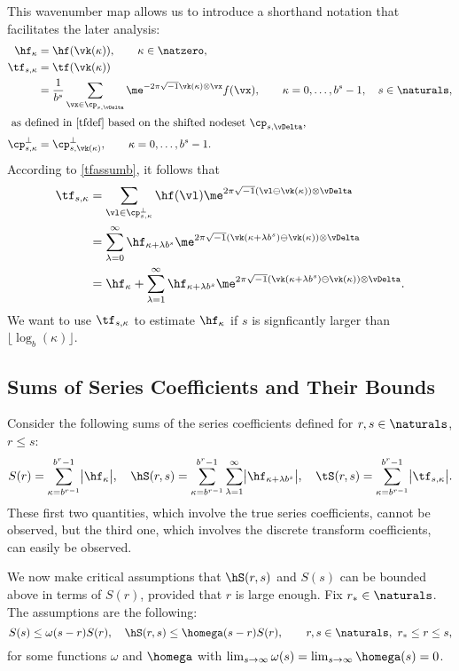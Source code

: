 \documentclass[]{elsarticle}
\begin{document}
This wavenumber map allows us to introduce a shorthand notation that facilitates the later analysis:
\begin{align*}
\hf_{\kappa} & =\hf(\vk(\kappa)), \qquad \kappa \in \natzero,\\
\tf_{s,\kappa}& = \tf(\vk(\kappa)) \\
& = \frac{1}{b^s} \sum_{\vx \in \cp_{s,\vDelta}} \me^{-2 \pi \sqrt{-1} \vk(\kappa) \otimes \vx} f(\vx), \qquad \kappa=0, \ldots, b^s-1, \quad s \in \naturals,\\
\intertext{ as defined in \eqref{tfdef} based on the shifted nodeset $\cp_{s,\vDelta}$,}
\cp^{\perp}_{s,\kappa}&=\cp^{\perp}_{s,\vk(\kappa)}, \qquad \kappa=0, \ldots, b^s-1.
\end{align*}
According to \eqref{tfassumb}, it follows that 
\begin{align}
\nonumber
\tf_{s,\kappa} &= \sum_{\vl \in \cp^{\perp}_{s,\kappa}} \hf(\vl) \me^{2 \pi \sqrt{-1} (\vl \ominus \vk(\kappa)) \otimes \vDelta} \\
\nonumber
&= \sum_{\lambda=0}^{\infty} \hf_{\kappa+\lambda b^{s}} \me^{2 \pi \sqrt{-1} (\vk(\kappa+\lambda b^{s}) \ominus \vk(\kappa)) \otimes \vDelta} \\
& = \hf_{\kappa} + \sum_{\lambda=1}^{\infty} \hf_{\kappa+\lambda b^{s}} \me^{2 \pi \sqrt{-1} (\vk(\kappa+\lambda b^{s}) \ominus \vk(\kappa)) \otimes \vDelta}.
\label{tfassumc}
\end{align}
We want to use $\tf_{s,\kappa}$ to estimate $\hf_{\kappa}$ if $s$ is signficantly larger than $\lfloor \log_b(\kappa) \rfloor$.

\subsection{Sums of Series Coefficients and Their Bounds}
Consider the following sums of the series coefficients defined for $r,s \in \naturals$, $r \le s$:
\begin{equation}
S(r) =  \sum_{\kappa=b^{r-1}}^{b^{r}-1} \bigl \lvert \hf_{\kappa} \bigr \rvert, \quad 
\hS(r,s)  = \sum_{\kappa=b^{r-1}}^{b^{r}-1} \sum_{\lambda=1}^{\infty} \bigl \lvert \hf_{\kappa+\lambda b^{s}}\bigr\rvert, \quad 
\tS(r,s) = \sum_{\kappa=b^{r-1}}^{b^{r}-1} \bigl \lvert \tf_{s,\kappa}\bigr\rvert.
\end{equation}
These first two quantities, which involve the true series coefficients, cannot be observed, but the third one, which involves the discrete transform coefficients, can easily be observed.

We now make critical assumptions that $\hS(r,s)$ and $S(s)$ can be bounded above in terms of $S(r)$, provided that $r$ is large enough.  Fix $r_* \in \naturals$.  The assumptions are the following:
\begin{equation}
S(s) \le \omega(s-r) S(r), \quad \hS(r,s) \le \homega(s-r) S(r), \qquad r,s \in \naturals, \ r_* \le r \le s,
\end{equation}
for some functions $\omega$ and $\homega$ with $\lim_{s \to \infty} \omega(s) = \lim_{s \to \infty} \homega(s) = 0$.  
\end{document}
